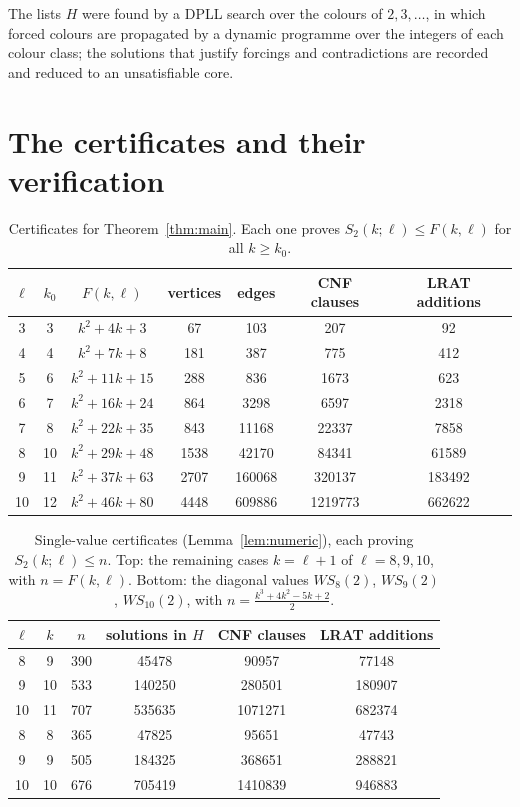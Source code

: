 \documentclass[11pt]{amsart}
\theoremstyle{definition}
\newcommand{\F}{F}
\newcommand{\Stwo}{S_2}
\begin{document}
\noindent The lists $H$ were found by a DPLL search over the colours of $2,3,\dots$, in which forced colours are propagated by a dynamic programme over the integers of each colour class; the solutions that justify forcings and contradictions are recorded and reduced to an unsatisfiable core.

\section{The certificates and their verification}\label{sec:verification}

\begin{table}[h]
\centering
\begin{tabular}{ccccccc}
\toprule
$\ell$ & $k_0$ & $\F(k,\ell)$ & vertices & edges & CNF clauses & LRAT additions\\
\midrule
3 & 3 & $k^2+4k+3$ & 67 & 103 & 207 & 92\\
4 & 4 & $k^2+7k+8$ & 181 & 387 & 775 & 412\\
5 & 6 & $k^2+11k+15$ & 288 & 836 & 1673 & 623\\
6 & 7 & $k^2+16k+24$ & 864 & 3298 & 6597 & 2318\\
7 & 8 & $k^2+22k+35$ & 843 & 11168 & 22337 & 7858\\
8 & 10 & $k^2+29k+48$ & 1538 & 42170 & 84341 & 61589\\
9 & 11 & $k^2+37k+63$ & 2707 & 160068 & 320137 & 183492\\
10 & 12 & $k^2+46k+80$ & 4448 & 609886 & 1219773 & 662622\\
\bottomrule
\end{tabular}
\caption{Certificates for Theorem~\ref{thm:main}. Each one proves $\Stwo(k;\ell)\le\F(k,\ell)$ for all $k\ge k_0$.}
\label{tab:certs}
\end{table}

\begin{table}[h]
\centering
\begin{tabular}{cccccc}
\toprule
$\ell$ & $k$ & $n$ & solutions in $H$ & CNF clauses & LRAT additions\\
\midrule
8 & 9 & 390 & 45478 & 90957 & 77148\\
9 & 10 & 533 & 140250 & 280501 & 180907\\
10 & 11 & 707 & 535635 & 1071271 & 682374\\
\midrule
8 & 8 & 365 & 47825 & 95651 & 47743\\
9 & 9 & 505 & 184325 & 368651 & 288821\\
10 & 10 & 676 & 705419 & 1410839 & 946883\\
\bottomrule
\end{tabular}
\caption{Single-value certificates (Lemma~\ref{lem:numeric}), each proving $\Stwo(k;\ell)\le n$. Top: the remaining cases $k=\ell+1$ of $\ell=8,9,10$, with $n=\F(k,\ell)$. Bottom: the diagonal values $WS_8(2)$, $WS_9(2)$, $WS_{10}(2)$, with $n=\frac{k^3+4k^2-5k+2}{2}$.}
\label{tab:single}
\end{table}
\end{document}
